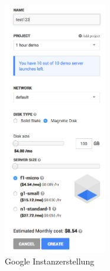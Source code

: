 \begin{figure}[!htbp]
  \centering
\includegraphics[width=0.4\textwidth]{./03_Analyse/03_Bitnami/images/google_instancereation}
\caption{Google Instanzerstellung}
\end{figure}

\newpage
